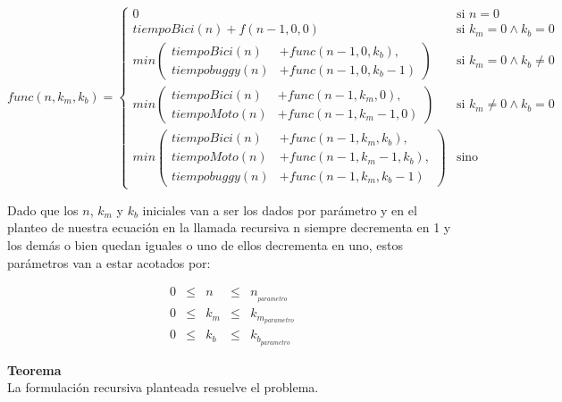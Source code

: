 \begin{equation*}
func(n, k_m, k_b) = 
\begin{cases} 
       0  & \mbox{si } n = 0  \\[2ex]
       tiempoBici(n) + f(n-1, 0, 0)  & \mbox{si } k_m=0 \wedge k_b=0 \\[2ex]
      min \left(
      \begin{split}
       tiempoBici(n) & + func(n-1, 0, k_b) , \\
       tiempobuggy(n) & + func(n-1, 0, k_b-1)
\end{split} \right) & \mbox{si } k_m=0 \wedge k_b\neq0 \\[3ex]
      min \left(
      \begin{split}
       tiempoBici(n) & + func(n-1, k_m, 0) , \\
       tiempoMoto(n) & + func(n-1, k_m-1, 0)
\end{split} \right) & \mbox{si } k_m\neq0 \wedge k_b=0 \\[3ex]
           min \left(
      \begin{split}
       tiempoBici(n) & + func(n-1, k_m, k_b) , \\
       tiempoMoto(n) & + func(n-1, k_m-1, k_b) , \\
       tiempobuggy(n) & + func(n-1, k_m, k_b-1)
\end{split} \right) & \mbox{sino}
\end{cases} 
\end{equation*}

Dado que los $n$, $k_m$ y $k_b$ iniciales van a ser los dados por par\'ametro y en el planteo de nuestra ecuaci\'on en la llamada recursiva n siempre decrementa en 1 y los dem\'as o bien quedan iguales o uno de ellos decrementa en uno, estos par\'ametros van a estar acotados por:

\begin{equation*}
\begin{array}{lllll}
0 & \leq & n &\leq & n_{_{parametro}} \\
0 & \leq & k_m & \leq & k_{m_{parametro}} \\
0 & \leq & k_b & \leq & k_{b_{parametro}}
\end{array}
\end{equation*}

\newpage

{\large\textbf{Teorema}}\\

La formulación recursiva planteada resuelve el problema.\\


